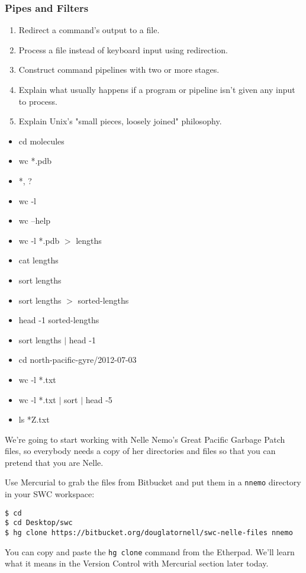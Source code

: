 \documentclass[xcolor=dvipsnames]{beamer}
\begin{document}
\begin{frame}[label=PipesAndFilters]
\frametitle{Pipes and Filters}
\begin{enumerate}

\item    Redirect a command's output to a file.
\item    Process a file instead of keyboard input using redirection.
\item    Construct command pipelines with two or more stages.
\item    Explain what usually happens if a program or pipeline isn't given any input to process.
\item    Explain Unix's "small pieces, loosely joined" philosophy.

\end{enumerate}
\begin{multicols}{2}
\begin{itemize}
\item cd molecules
\item wc *.pdb
\item *, ?
\item wc -l
\item wc --help
\item wc -l *.pdb $>$ lengths
\item cat lengths
\item sort lengths
\item sort lengths $>$ sorted-lengths
\item head -1 sorted-lengths
\item sort lengths $|$ head -1
\item cd north-pacific-gyre/2012-07-03
\item wc -l *.txt
\item wc -l *.txt $|$ sort $|$ head -5
\item ls *Z.txt
\end{itemize}
\end{multicols}
\end{frame}


\begin{frame}[fragile]
We're going to start working with Nelle Nemo's Great Pacific Garbage Patch files,
so everybody needs a copy of her directories and files so that you can pretend that you are Nelle.

Use Mercurial to grab the files from Bitbucket and put them in a {\tt nnemo} directory in your SWC workspace:
{\footnotesize
\begin{verbatim}
$ cd
$ cd Desktop/swc
$ hg clone https://bitbucket.org/douglatornell/swc-nelle-files nnemo
\end{verbatim}
}

You can copy and paste the {\tt hg clone} command from the Etherpad.
We'll learn what it means in the Version Control with Mercurial section later today.
\end{frame}
\end{document}
